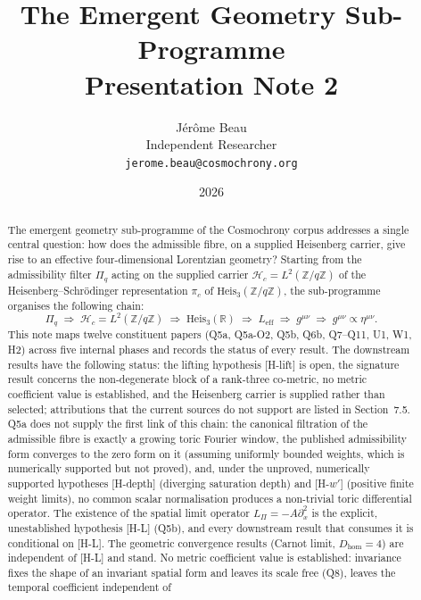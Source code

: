 \documentclass[11pt,a4paper]{article}
\title{The Emergent Geometry Sub-Programme\\[0.4em]
\large Presentation Note 2}
\author{J\'{e}r\^{o}me Beau\\[0.3em]
\small Independent Researcher\\
\small \texttt{jerome.beau@cosmochrony.org}}
\date{2026}
\theoremstyle{definition}
\newcommand{\Heis}{\mathrm{Heis}}
\newcommand{\Leff}{L_{\mathrm{eff}}}
\newcommand{\Lpi}{L_\Pi}
\newcommand{\geff}{g^{\mu\nu}}
\newcommand{\Dhom}{D_{\mathrm{hom}}}
\begin{document}
  \maketitle

  \begin{abstract}
    The emergent geometry sub-programme of the Cosmochrony corpus addresses a single
    central question: how does the admissible fibre, on a supplied Heisenberg carrier, give rise
    to an effective four-dimensional Lorentzian geometry?
    Starting from the admissibility filter $\Pi_q$ acting on the supplied carrier
    $\mathcal{H}_c = L^2(\mathbb{Z}/q\mathbb{Z})$ of the Heisenberg--Schr\"{o}dinger representation
    $\pi_c$ of $\Heis_3(\mathbb{Z}/q\mathbb{Z})$, the sub-programme organises the following chain:
    \[
      \Pi_q
      \;\Longrightarrow\;
      \mathcal{H}_c = L^2(\mathbb{Z}/q\mathbb{Z})
      \;\Longrightarrow\;
      \Heis_3(\mathbb{R})
      \;\Longrightarrow\;
      \Leff
      \;\Longrightarrow\;
      \geff
      \;\Longrightarrow\;
      \geff \propto \eta^{\mu\nu}.
    \]
    This note maps twelve constituent papers (Q5a, Q5a-O2, Q5b, Q6b, Q7--Q11, U1, W1, H2)
    across five internal phases and records the status of every result.
    The downstream results have the following status: the lifting hypothesis [H-lift]
    is open, the signature result concerns the non-degenerate block of a rank-three co-metric,
    no metric coefficient value is established, and the Heisenberg carrier is supplied rather
    than selected; attributions that the current sources do not support are listed in Section~7.5.
    Q5a does not supply the first link of this chain: the canonical filtration of the
    admissible fibre is exactly a growing toric Fourier window, the published admissibility
    form converges to the zero form on it (assuming uniformly bounded weights, which is
    numerically supported but not proved), and, under the unproved, numerically supported
    hypotheses [H-depth] (diverging saturation depth) and [H-$w'$] (positive finite weight
    limits), no common scalar normalisation produces a non-trivial toric differential operator.
    The existence of the spatial limit operator $\Lpi = -A\partial_x^2$ is the explicit,
    unestablished hypothesis [H-L] (Q5b), and every downstream result that
    consumes it is conditional on [H-L].
    The geometric convergence results (Carnot limit, $\Dhom = 4$) are independent of [H-L]
    and stand.
    No metric coefficient value is established: invariance fixes the shape of an invariant
    spatial form and leaves its scale free (Q8), leaves the temporal coefficient independent of

\end{abstract}
\end{document}
